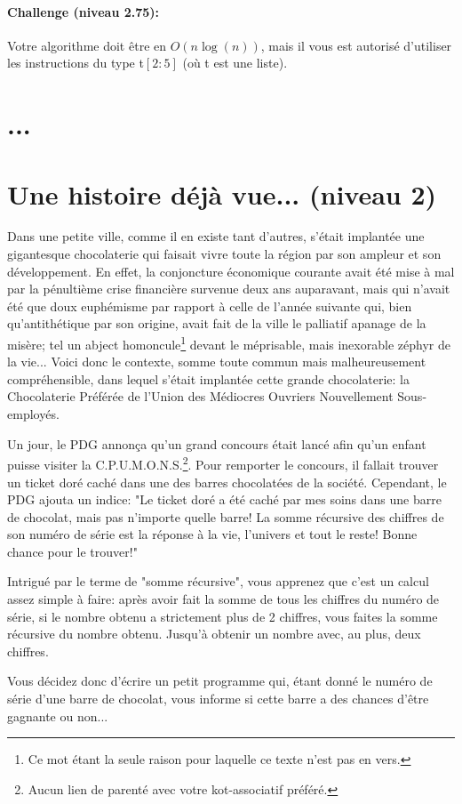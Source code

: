 \documentclass[a4paper]{article}
\begin{document}
\paragraph{Challenge (niveau 2.75): }
Votre algorithme doit être en $O(n \log (n))$, mais il vous est autorisé d'utiliser les instructions du type t$[2:5]$ (où t est une liste).


\section{...}



\section{Une histoire déjà vue... (niveau 2)}
Dans une petite ville, comme il en existe tant d'autres, s'était implantée une gigantesque chocolaterie qui faisait vivre toute la région par son ampleur et son développement. En effet, la conjoncture économique courante avait été mise à mal par la pénultième crise financière survenue deux ans auparavant, mais qui n'avait été que doux euphémisme par rapport à celle de l'année suivante qui, bien qu'antithétique par son origine, avait fait de la ville le palliatif apanage de la misère; tel un abject homoncule\footnote{Ce mot étant la seule raison pour laquelle ce texte n'est pas en vers.} devant le méprisable, mais inexorable zéphyr de la vie... Voici donc le contexte, somme toute commun mais malheureusement compréhensible, dans lequel s'était implantée cette grande chocolaterie: la Chocolaterie Préférée de l'Union des Médiocres Ouvriers Nouvellement Sous-employés.\\
\par Un jour, le PDG annonça qu'un grand concours était lancé afin qu'un enfant puisse visiter la C.P.U.M.O.N.S.\footnote{Aucun lien de parenté avec votre kot-associatif préféré.}. Pour remporter le concours, il fallait trouver un ticket doré caché dans une des barres chocolatées de la société. Cependant, le PDG ajouta un indice: "Le ticket doré a été caché par mes soins dans une barre de chocolat, mais pas n'importe quelle barre! La somme récursive des chiffres de son numéro de série est la réponse à la vie, l'univers et tout le reste! Bonne chance pour le trouver!"
\par Intrigué par le terme de "somme récursive", vous apprenez que c'est un calcul assez simple à faire: après avoir fait la somme de tous les chiffres du numéro de série, si le nombre obtenu a strictement plus de 2 chiffres, vous faites la somme récursive du nombre obtenu. Jusqu'à obtenir un nombre avec, au plus, deux chiffres.
\par Vous décidez donc d'écrire un petit programme qui, étant donné le numéro de série d'une barre de chocolat, vous informe si cette barre a des chances d'être gagnante ou non...
\end{document}
